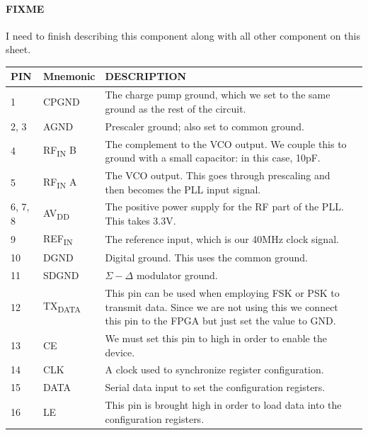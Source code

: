 \paragraph{FIXME} I need to finish describing this component along with all other component on this
sheet.

\label{tab:adf4158-pins}
\begin{tabularx}{\textwidth}{l l X>{\raggedright\arraybackslash}X}
  \caption{All ADF4158 pin connections.} \\
  \toprule
  \textbf{PIN} & \textbf{Mnemonic} & \textbf{DESCRIPTION} \\
  \midrule

  \endhead{}

  1 & CPGND & The charge pump ground, which we set to the same ground as the rest of the circuit. \\
  2, 3 & AGND & Prescaler ground; also set to common ground. \\
  4 & RF\textsubscript{IN} B & The complement to the VCO output. We couple this to ground with a
                               small capacitor: in this case, 10pF. \\
  5 & RF\textsubscript{IN} A & The VCO output. This goes through prescaling and then becomes the PLL
                               input signal. \\
  6, 7, 8 & AV\textsubscript{DD} & The positive power supply for the RF part of the PLL. This takes
                                   3.3V. \\
  9 & REF\textsubscript{IN} & The reference input, which is our 40MHz clock signal. \\
  10 & DGND & Digital ground. This uses the common ground. \\
  11 & SDGND & $\Sigma-\Delta$ modulator ground. \\
  12 & TX\textsubscript{DATA} & This pin can be used when employing FSK or PSK to transmit
                                data. Since we are not using this we connect this pin to the FPGA
                                but just set the value to GND. \\
  13 & CE & We must set this pin to high in order to enable the device. \\
  14 & CLK & A clock used to synchronize register configuration. \\
  15 & DATA & Serial data input to set the configuration registers. \\
  16 & LE & This pin is brought high in order to load data into the configuration registers. \\

\end{tabularx}
